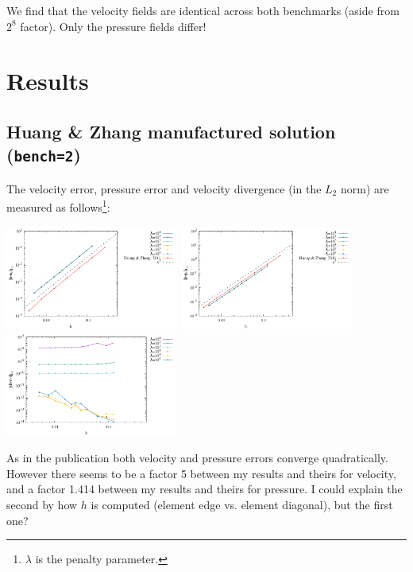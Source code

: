 We find that the velocity fields are identical across 
both benchmarks (aside from $2^8$ factor). Only the pressure fields differ!




\newpage
\section*{Results}

\subsection*{Huang \& Zhang manufactured solution ({\tt bench=2})}

The velocity error, pressure error and velocity divergence (in the $L_2$ norm) are 
measured as follows\footnote{$\lambda$ is the penalty parameter.}:  
\begin{center}
\includegraphics[width=5.7cm]{python_codes/fieldstone_161/results/bench2/errorsV.pdf}
\includegraphics[width=5.7cm]{python_codes/fieldstone_161/results/bench2/errorsP.pdf}
\includegraphics[width=5.7cm]{python_codes/fieldstone_161/results/bench2/errorsDivv.pdf}
\end{center}
As in the publication both velocity and pressure errors converge quadratically.
However there seems to be a factor 5 between my results and theirs for velocity, 
and a factor 1.414 between my results and theirs for pressure. I could 
explain the second by how $h$ is computed (element edge vs. element diagonal), 
but the first one?

